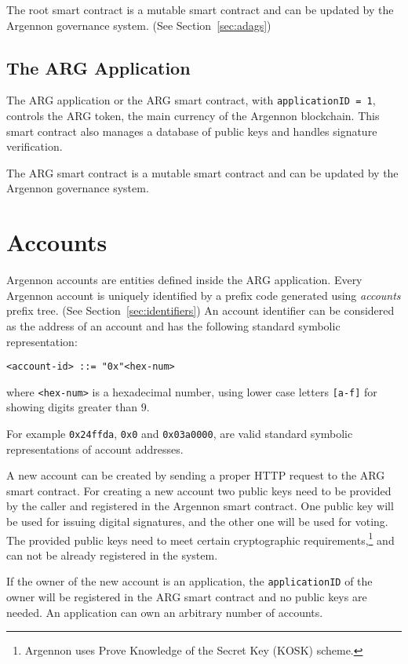 The root smart contract is a mutable smart contract and can be updated by the Argennon governance system.
(See Section~\ref{sec:adags})

\subsection{The ARG Application}\label{subsec:the-arg-app}

The ARG application or the ARG smart contract,
with \texttt{applicationID = 1}, controls the ARG token, the main
currency of the Argennon blockchain. This smart contract also manages a database of public keys and
handles signature verification.

The ARG smart contract is a mutable smart contract and can be updated by the Argennon governance system.


\section{Accounts}\label{sec:accounts}

Argennon accounts are entities defined inside the ARG application.
Every Argennon account is uniquely identified by a prefix code generated using \emph{accounts} prefix
tree. (See Section~\ref{sec:identifiers}) An account
identifier can be considered as the address of an account and has the following standard symbolic representation:
\begin{verbatim}
<account-id> ::= "0x"<hex-num>
\end{verbatim}
where \texttt{<hex-num>} is a hexadecimal number, using lower case
letters \texttt{[a-f]} for showing digits greater than $9$.

For example \texttt{0x24ffda}, \texttt{0x0} and \texttt{0x03a0000}, are valid standard symbolic
representations of account addresses.

A new account can be created by sending a proper HTTP request to the ARG smart contract. For creating
a new account two public keys need to be provided by the caller and registered in the Argennon smart contract.
One public key will be used for issuing digital signatures, and the other one will be used for voting. The
provided public keys need to meet certain cryptographic requirements,\footnote{Argennon uses Prove
Knowledge of the Secret Key (KOSK) scheme.} and can not be already registered in the system.

If the owner of the new account is an application, the \texttt{applicationID} of the owner will be registered in the
ARG smart contract and no public keys are needed. An application can own an arbitrary number of accounts.

